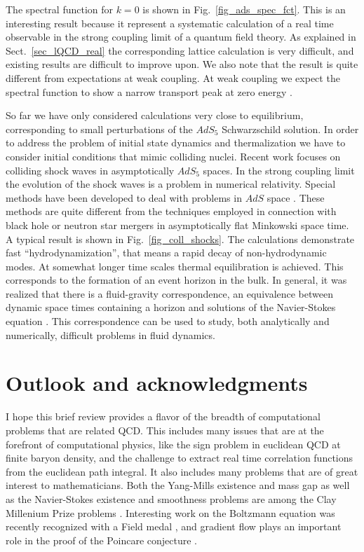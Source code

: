 \vspace*{0.3cm} 
The spectral function for $k=0$ is shown in Fig.~\ref{fig_ads_spec_fct}. This 
is an interesting result because it represent a systematic calculation of a
real time observable in the strong coupling limit of a quantum field theory. 
As explained in Sect.~\ref{sec_lQCD_real} the corresponding lattice 
calculation is very difficult, and existing results are difficult to improve 
upon. We also note that the result is quite different from expectations at 
weak coupling. At weak coupling we expect the spectral function to show a 
narrow transport peak at zero energy \cite{Schaefer:2014awa}.

 So far we have only considered calculations very close to equilibrium, 
corresponding to small perturbations of the $AdS_5$ Schwarzschild solution. 
In order to address the problem of initial state dynamics and thermalization
we have to consider initial conditions that mimic colliding nuclei. Recent
work focuses on colliding shock waves in asymptotically $AdS_5$ spaces. 
In the strong coupling limit the evolution of the shock waves is a problem
in numerical relativity. Special methods have been developed to deal 
with problems in $AdS$ space \cite{Chesler:2013lia}. These methods are 
quite different from the techniques employed in connection with black
hole or neutron star mergers in asymptotically flat Minkowski space time. 
A typical result is shown in Fig.~\ref{fig_coll_shocks}. The calculations
demonstrate fast ``hydrodynamization'', that means a rapid decay of 
non-hydrodynamic modes. At somewhat longer time scales thermal 
equilibration is achieved. This corresponds to the formation of an 
event horizon in the bulk. In general, it was realized that there 
is a fluid-gravity correspondence, an equivalence between dynamic 
space times containing a horizon and solutions of the Navier-Stokes
equation \cite{Rangamani:2009xk}. This correspondence can be used 
to study, both analytically and numerically, difficult problems in 
fluid dynamics.  

\section{Outlook and acknowledgments}
\label{sec_out}

 I hope this brief review provides a flavor of the breadth of computational
problems that are related QCD. This includes many issues that are at the 
forefront of computational physics, like the sign problem in euclidean 
QCD at finite baryon density, and the challenge to extract real time 
correlation functions from the euclidean path integral. It also includes
many problems that are of great interest to mathematicians. Both the 
Yang-Mills existence and mass gap as well as the Navier-Stokes existence 
and smoothness problems are among the Clay Millenium Prize problems
\cite{Clay-YM,Clay-NS}. Interesting work on the Boltzmann equation was 
recently recognized with a Field medal \cite{Villani:2009}, and gradient 
flow plays an important role in the proof of the Poincare conjecture
\cite{Perelman}. 



